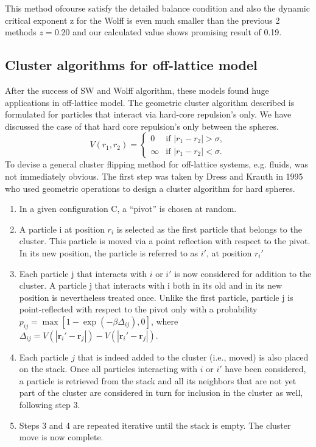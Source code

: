 \documentclass[a4paper,8pt]{article}
\begin{document}
This method ofcourse satisfy the detailed balance condition\supercite{Wolff_algo} and also the dynamic
critical exponent z for the Wolff is even much smaller than the previous 2 methods $z = 0.20$ and our calculated value shows promising result of 0.19. \\

\subsection{Cluster algorithms for off-lattice model}
After the success of SW and Wolff algorithm, these models found huge applications in off-lattice model. The geometric cluster algorithm described is formulated for particles that interact via hard-core repulsion's only. We have discussed the case of that hard core repulsion's only between the spheres. 
\begin{equation}
    V(r_{1}, r_{2}) = \begin{cases}
0 & \text{if } |r_{1} - r_{2}| > \sigma, \\
\infty & \text{if } |r_{1} - r_{2}| < \sigma.
\end{cases}
\end{equation}
To devise a general cluster flipping method for off-lattice systems, e.g. fluids, was not immediately obvious. The first step was taken by Dress and Krauth in 1995 who used geometric operations to design a cluster algorithm for hard spheres. 
\begin{enumerate}
    \item In a given configuration C, a \enquote{pivot} is chosen at random.
    \item A particle i at position $r_i$ is selected as the first particle that belongs to the cluster. This particle is moved via a point reflection with respect to the pivot. In its new position, the particle is referred to as $i'$, at position $r_i'$
  \item Each particle j that interacts with $i$ or $i'$ is now considered for addition to the cluster. A particle j that interacts with i both in its old and in its new position is nevertheless treated once. Unlike the first particle, particle j is point-reflected with respect to the pivot only with a probability $p_{ij} = \max[1 - \exp(-\beta \Delta_{ij}), 0]$, where $\Delta_{ij} = V(|\mathbf{r}_i' - \mathbf{r}_j|) - V(|\mathbf{r}_i' - \mathbf{r}_j|)$.
    \item Each particle $j$ that is indeed added to the cluster (i.e., moved) is also placed on the stack. Once all particles interacting with $i$ or $i'$ have been considered, a particle is retrieved from the stack and all its neighbors that are not yet part of the cluster are considered in turn for inclusion in the cluster as well, following step 3.
    \item Steps 3 and 4 are repeated iterative until the stack is empty. The cluster move is now complete.
\end{enumerate}
\end{document}
